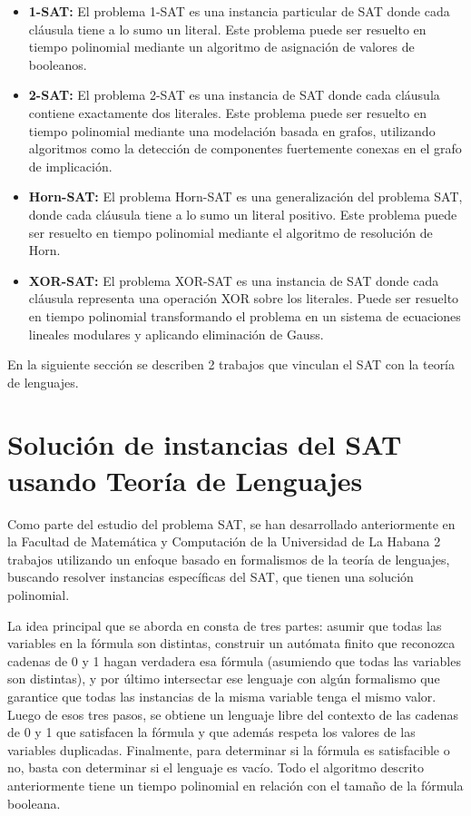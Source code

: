 \documentclass[12pt]{article}
\begin{document}
\begin{itemize}
      \item \textbf{1-SAT:} El problema 1-SAT es una instancia particular de SAT donde cada cláusula tiene a lo sumo un literal.
            Este problema puede ser resuelto en tiempo polinomial mediante un algoritmo de asignación de valores de booleanos.
            
      \item \textbf{2-SAT:} El problema 2-SAT es una instancia de SAT donde cada cláusula contiene exactamente dos literales.
            Este problema puede ser resuelto en tiempo polinomial mediante una modelación basada en grafos, 
            utilizando algoritmos como la detección de componentes fuertemente conexas en el grafo de implicación.
            
      \item \textbf{Horn-SAT:} El problema Horn-SAT es una generalización del problema SAT,
            donde cada cláusula tiene a lo sumo un literal positivo. 
            Este problema puede ser resuelto en tiempo polinomial mediante el algoritmo de resolución de Horn.
            
      \item \textbf{XOR-SAT:} El problema XOR-SAT es una instancia de SAT donde cada cláusula representa una operación XOR
            sobre los literales. Puede ser resuelto en tiempo polinomial transformando el problema en un sistema de ecuaciones 
            lineales modulares y aplicando eliminación de Gauss.
\end{itemize}

En la siguiente sección se describen 2 trabajos que vinculan el SAT con la teoría de lenguajes.

\section{Solución de instancias del SAT usando Teoría de Lenguajes}

Como parte del estudio del problema SAT, se han desarrollado anteriormente en 
la Facultad de Matemática y Computación de la Universidad de La Habana 
2 trabajos utilizando un enfoque 
basado en formalismos de la teoría de lenguajes, buscando resolver 
instancias específicas del SAT, que tienen una solución polinomial. 

La idea principal que se aborda en \cite{aCFSAT} consta de tres partes: asumir que todas las variables en 
la fórmula son distintas, construir un autómata finito que reconozca cadenas de 0 y 1 hagan verdadera esa 
fórmula (asumiendo que todas las variables son distintas), y por último intersectar ese lenguaje con algún 
formalismo que garantice que todas las instancias de la misma variable tenga el mismo valor. Luego de esos 
tres pasos, se obtiene un lenguaje libre del contexto de las cadenas de 0 y 1 que satisfacen la fórmula y 
que además respeta los valores de las variables duplicadas.  Finalmente, para determinar si la fórmula es 
satisfacible o no, basta con determinar si el lenguaje es vacío. Todo el algoritmo descrito anteriormente tiene un tiempo polinomial en relación con el 
tamaño de la fórmula booleana.
\end{document}
